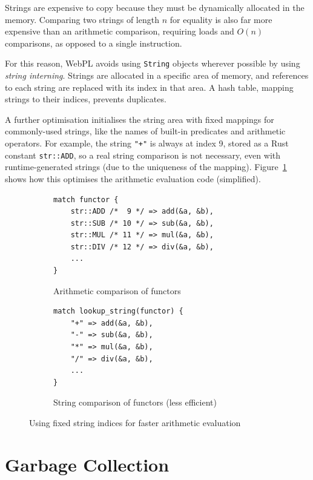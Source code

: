 Strings are expensive to copy because they must be dynamically allocated in the memory. Comparing two strings of length $n$ for equality is also far more expensive than an arithmetic comparison, requiring loads and $O(n)$ comparisons, as opposed to a single instruction.

For this reason, WebPL avoids using \texttt{String} objects wherever possible by using \emph{string interning}. Strings are allocated in a specific area of memory, and references to each string are replaced with its index in that area. A hash table, mapping strings to their indices, prevents duplicates.

A further optimisation initialises the string area with fixed mappings for commonly-used strings, like the names of built-in predicates and arithmetic operators. For example, the string \texttt{"+"} is always at index 9, stored as a Rust constant \texttt{str::ADD}, so a real string comparison is not necessary, even with runtime-generated strings (due to the uniqueness of the mapping). Figure~\ref{fig:fixed-string-indices} shows how this optimises the arithmetic evaluation code (simplified).

\begin{figure}[H]
\centering
\begin{subfigure}{.5\textwidth}
\centering
\begin{verbatim}
match functor {
    str::ADD /*  9 */ => add(&a, &b),
    str::SUB /* 10 */ => sub(&a, &b),
    str::MUL /* 11 */ => mul(&a, &b),
    str::DIV /* 12 */ => div(&a, &b),
    ...
}
\end{verbatim}
\caption{Arithmetic comparison of functors}
\end{subfigure}%
\begin{subfigure}{.5\textwidth}
\centering
\begin{verbatim}
match lookup_string(functor) {
    "+" => add(&a, &b),
    "-" => sub(&a, &b),
    "*" => mul(&a, &b),
    "/" => div(&a, &b),
    ...
}
\end{verbatim}
\caption{String comparison of functors (less efficient)}
\end{subfigure}
\caption{Using fixed string indices for faster arithmetic evaluation}
\label{fig:fixed-string-indices}
\end{figure}

\newpage

\section{Garbage Collection}


